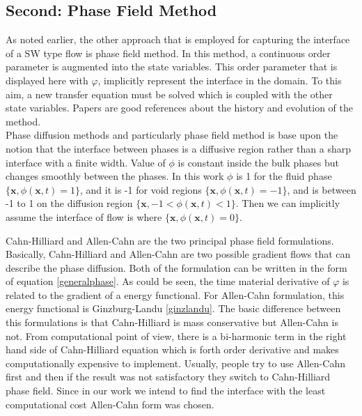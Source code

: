 \documentclass[letterpaper,10pt]{article}
\begin{document}
\subsection{Second: Phase Field Method} \label{phase field}
As noted earlier, the other approach that is employed 
for capturing the interface of a SW type flow is phase field method.
In this method, a continuous
order parameter is augmented into the state variables. This order parameter that is displayed here with $\varphi$, 
implicitly represent the interface in the domain. To this aim, a new transfer equation must be solved which is coupled with the other state variables. Papers \cite{Chen2002,Anderson1998,Boettinger2002,Kim2012} are good references about the history and evolution of the method.\\
Phase diffusion methods and particularly phase field method is base upon the notion that the interface between phases is a diffusive region rather than a sharp interface with a finite width. 
Value of $\phi$ is constant inside the bulk phases but changes smoothly between the phases. In this work $\phi$ is 1 for the fluid phase $ \lbrace \textbf{x}, \phi(\textbf{x},t)=1 \rbrace  $, and it is -1 for void regions $ \lbrace \textbf{x}, \phi(\textbf{x},t)=-1 \rbrace  $, and is between -1 to 1 on the diffusion region $ \lbrace \textbf{x}, -1 < \phi(\textbf{x},t) < 1 \rbrace  $. Then we can implicitly assume the interface of flow is where $ \lbrace \textbf{x}, \phi(\textbf{x},t)= 0 \rbrace  $.\newline

Cahn-Hilliard and Allen-Cahn are the two principal phase field formulations. Basically, Cahn-Hilliard and Allen-Cahn are two possible gradient flows that can describe the phase diffusion. Both of the formulation can be written in the form of equation \eqref{generalphase}. 
 As could be seen, the time material derivative of $\varphi$ is related to the gradient of a energy functional. For Allen-Cahn formulation, this energy functional is Ginzburg-Landu \eqref{ginzlandu}. 
The basic difference between this formulations is that
Cahn-Hilliard is mass conservative but Allen-Cahn is not. From computational point of view, there is a bi-harmonic term in the right hand side of Cahn-Hilliard equation which is forth order derivative and makes computationally expensive to implement. Usually, people try to 
use Allen-Cahn first and then if the result was not satisfactory they switch to Cahn-Hilliard phase field. 
Since in our work we intend to find the interface with the least computational cost Allen-Cahn form was chosen. 
\end{document}
